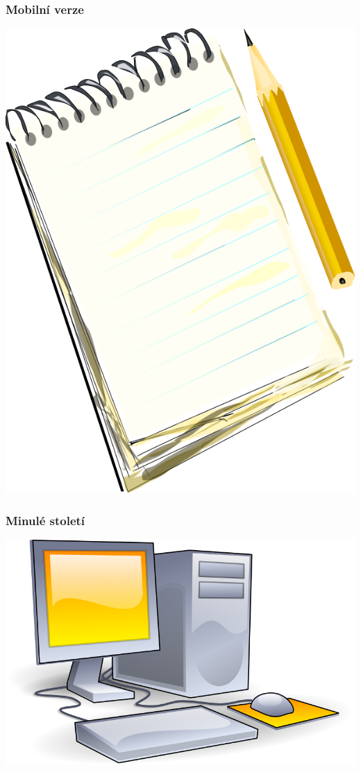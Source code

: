 \documentclass{beamer}
\begin{document}
\begin{frame}
\frametitle{Mobilní verze}
\begin{center}
\includegraphics[height=.7\paperheight]{Degri_Notepad_Pencil}
\end{center}
\end{frame}

\begin{frame}
\frametitle{Minulé století}
\begin{center}
\includegraphics[height=.7\paperheight]{AJ_Computer}
\end{center}
\end{frame}
\end{document}
